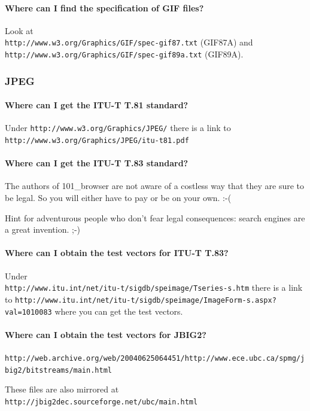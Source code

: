 \documentclass[10pt]{scrbook}
\begin{document}
\paragraph{Where can I find the specification of GIF files?}
Look at \\
\verb|http://www.w3.org/Graphics/GIF/spec-gif87.txt| (GIF87A) and \\
\verb|http://www.w3.org/Graphics/GIF/spec-gif89a.txt| (GIF89A).

\subsubsection{JPEG}

\paragraph{Where can I get the ITU-T T.81 standard?} Under \verb|http://www.w3.org/Graphics/JPEG/| there is a link to \verb|http://www.w3.org/Graphics/JPEG/itu-t81.pdf|

\paragraph{Where can I get the ITU-T T.83 standard?} The authors of 101\_browser are not aware of a costless way that they are sure to be legal. So you will either have to pay or be on your own. :-(

Hint for adventurous people who don't fear legal consequences: search engines are a great invention. ;-)

\paragraph{Where can I obtain the test vectors for ITU-T T.83?} Under \\
\verb|http://www.itu.int/net/itu-t/sigdb/speimage/Tseries-s.htm|
there is a link to
\verb|http://www.itu.int/net/itu-t/sigdb/speimage/ImageForm-s.aspx?val=1010083|
where you can get the test vectors.

\paragraph{Where can I obtain the test vectors for JBIG2?}

\verb|http://web.archive.org/web/20040625064451/http://www.ece.ubc.ca/spmg/jbig2/bitstreams/main.html|

These files are also mirrored at \verb|http://jbig2dec.sourceforge.net/ubc/main.html|
\end{document}

